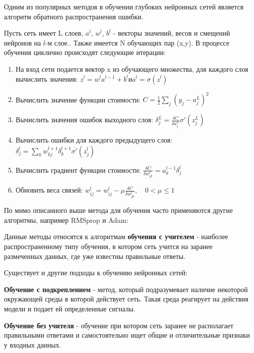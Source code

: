  

Одним из популярных методов в обучении глубоких нейронных сетей является алгоритм обратного распространения ошибки. 

Пусть сеть имеет L слоев, $a^l$, $w_{}^l$, $b^l$ - векторы значений, весов и смещений нейронов на $l$-м слое.. Также имеется N обучающих пар (x,y). 
В процессе обучения циклично происходят следующие итерации: 

\begin{enumerate}
    \item На вход сети подается вектор x из обучающего множества, для каждого слоя вычислить значения: \hfill $z^l = w^la^{l-1}+b^l и a^l = \sigma(z^l)$
    \item Вычислить значение функции стоимости: \hfill $C = \frac{1}{2}\sum_j{(y_j-a_j^L)^2}$
    \item Вычислить значения ошибок выходного слоя: \hfill $\delta_j^L=\frac{\delta C}{\delta a_j^L}\sigma'(z_j^L)$
    \item Вычислить ошибки для каждого предыдущего слоя: \hfill $\delta_j^l=\sum_k{w_{kj}^{l+1} \delta_k^{l+1}\sigma'(z_j^l)}$
    \item Вычислить градиент функции стоимости: \hfill $\frac{\delta C}{\delta w_{jk}^l} = a_k^{l-1} \delta_j^l$ %
    \item Обновить веса связей: \hfill $w_{ij}^l=w_{ij}^l-\mu\frac{\delta C}{\delta w_{jk}^l},\hspace{1em} 0<\mu \leqslant 1$
\end{enumerate}
\vspace{1em}
По мимо описанного выше метода для обучения часто применяются другие алгоритмы, например RMSprop и Adam:



\vspace{1em}
Данные методы относятся к алгоритмам \textbf{обучения с учителем} - наиболее распространенному типу обучения, в котором сеть учится на заранее размеченных данных, где уже известны правильные ответы.

Существует и другие подходы к обучению нейронных сетей:

\textbf{Обучение с подкреплением} - метод, который подразумевает наличие некоторой окружающей среды в которой действует сеть. Такая среда реагирует на действия модели и подает ей определенные сигналы.  

\textbf{Обучение без учителя} - обучение при котором сеть заранее не располагает правильными ответами и самостоятельно ищет общие и отличительные признаки у входных данных. 

